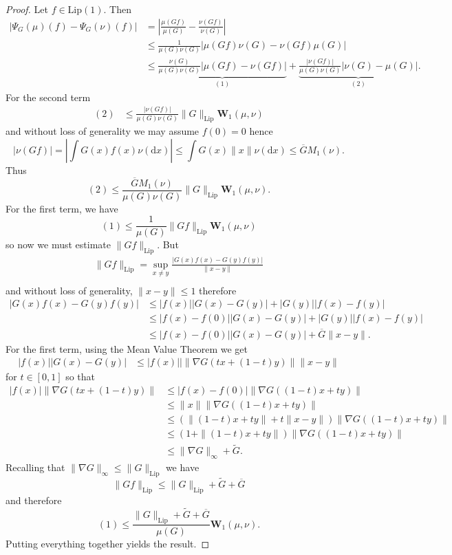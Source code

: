 \documentclass[10pt,a4paper]{amsart}
\newcommand{\W}{\mathbf{W}}
\newcommand{\dd}{\mathrm{d}}
\newcommand{\lip}{\mathrm{Lip}}
\newcommand{\ovl}[1]{\overline{#1}}
\newcommand{\wtilde}[1]{\widetilde{#1}}
\begin{document}
	\begin{proof}
		Let $f\in \lip(1)$. Then
		\begin{align*}
			|\Psi_G(\mu)(f) - \Psi_G(\nu)(f)|&=\left|\frac{\mu(Gf)}{\mu(G)} - \frac{\nu(Gf)}{\nu(G)}\right|\\
			&\leq \frac{1}{\mu(G)\nu(G)}|\mu(Gf)\nu(G) - \nu(Gf)\mu(G)|\\
			&\leq \underbrace{\frac{\nu(G)}{\mu(G)\nu(G)}|\mu(Gf) - \nu(Gf)|}_{(1)} + \underbrace{\frac{|\nu(Gf)|}{\mu(G)\nu(G)}|\nu(G) - \mu(G)|}_{(2)}.
		\end{align*}
		For the second term
		\begin{align*}
			(2)&\leq \frac{|\nu(Gf)|}{\mu(G)\nu(G)}\|G\|_{\lip}\W_1(\mu,\nu)
		\end{align*}
		and without loss of generality we may assume $f(0)=0$ hence
		\[
			|\nu(Gf)|= \left|\int G(x)f(x)\nu(\dd x)\right|\leq \int G(x)\|x\|\nu(\dd x)\leq \ovl{G} M_1(\nu).
		\]Thus 
		\[
			(2)\leq \frac{\ovl{G} M_1(\nu)}{\mu(G)\nu(G)}\|G\|_{\lip}\W_1(\mu,\nu).
		\]For the first term, we have
		\[
			(1)\leq \frac{1}{\mu(G)}\|Gf\|_{\lip}\W_1(\mu,\nu)
		\]so now we must estimate $\|Gf\|_{\lip}$. But
		\begin{align*}
		    \|Gf\|_{\lip} = \sup_{x\neq y}\frac{|G(x)f(x) - G(y)f(y)|}{\|x-y\|}\\
		\end{align*}
		and without loss of generality, $\|x-y\|\leq 1$ therefore
		\begin{align*}
		    |G(x)f(x) - G(y)f(y)| &\leq |f(x)||G(x) - G(y)| + |G(y)||f(x) - f(y)|\\
		    &\leq |f(x) - f(0)||G(x) - G(y)| + |G(y)||f(x) - f(y)|\\
		    &\leq |f(x) - f(0)||G(x) - G(y)| + \ovl{G}\|x-y\|.
		\end{align*}
		For the first term, using the Mean Value Theorem we get
		\begin{align*}
			|f(x)||G(x) - G(y)|&\leq |f(x)||\|\nabla G(tx + (1-t)y)\|\|x-y\|
		\end{align*}
		for $t\in [0,1]$ so that
		\begin{align*}
			|f(x)|\|\nabla G(tx + (1-t)y)\|&\leq |f(x) - f(0)|\|\nabla G((1-t)x + ty)\|\\
			&\leq \|x\|\|\nabla G((1-t)x + ty)\|\\
			&\leq (\|(1-t)x + ty\| + t\|x-y\|)\|\nabla G((1-t)x + ty)\|\\
			&\leq (1 + \|(1-t)x + ty\|)\|\nabla G((1-t)x + ty)\|\\
			&\leq \|\nabla G\|_\infty + \wtilde{G}.
		\end{align*}
		Recalling that $\|\nabla G\|_\infty\leq \|G\|_{\lip}$ we have
		\[
			\|Gf\|_{\lip}\leq \|G\|_{\lip} + \wtilde{G} + \ovl{G}
		\]and therefore
		\[
			(1)\leq \frac{\|G\|_{\lip} + \wtilde{G} + \ovl{G}}{\mu(G)}\W_1(\mu,\nu).
		\]Putting everything together yields the result.
	\end{proof}
\end{document}

